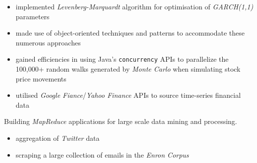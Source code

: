 \documentclass[letterpaper,11pt]{article}
\begin{document}
\begin{description}[style=multiline,leftmargin=3cm]
	      \begin{itemize}
		      \item implemented \textit{Levenberg-Marquardt} algorithm for optimisation of \textit{GARCH(1,1)} parameters
		      \item made use of object-oriented techniques and patterns to accommodate these numerous approaches
		      \item gained efficiencies in using Java's \texttt{concurrency} APIs to parallelize the 100,000+ random walks generated by \textit{Monte Carlo} when simulating stock price movements
		      \item utilised \textit{Google Fiance}/\textit{Yahoo Finance} APIs to source time-series financial data
	      \end{itemize}
	\item[Data Mining \textnormal{\tiny\href{https://github.com/Adrian-Ng/HadoopEnron}{adrian.ng/java/enron}}] Building \textit{MapReduce} applications for large scale data mining and processing.
	      \begin{description}[style=multiline,leftmargin=3cm]
		      \item[MapReduce]
		            \begin{itemize}
			            \item aggregation of \textit{Twitter} data
			            \item scraping a large collection of emails in the \textit{Enron Corpus}

\end{itemize}
\end{description}
\end{description}
\end{document}
